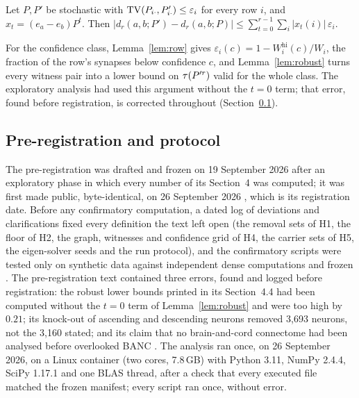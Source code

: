 \begin{lemma}\label{lem:robust}
Let $P,P'$ be stochastic with $\operatorname{TV}(P_{i\cdot},P'_{i\cdot})\le\varepsilon_i$ for every row $i$, and
$x_t=(e_a-e_b)P^t$. Then
$\bigl|d_r(a,b;P')-d_r(a,b;P)\bigr|\le\sum_{t=0}^{r-1}\sum_i |x_t(i)|\,\varepsilon_i$.
\end{lemma}

For the confidence class, Lemma~\ref{lem:row} gives
$\varepsilon_i(c)=1-W^{\mathrm{hi}}_i(c)/W_i$, the fraction of the row's synapses below confidence
$c$, and Lemma~\ref{lem:robust} turns every witness pair into a lower bound on $\tau(P'^r)$ valid for
the whole class. The exploratory analysis had used this argument without the $t=0$ term; that
error, found before registration, is corrected throughout (Section~\ref{sec:prereg}).

\subsection{Pre-registration and protocol}\label{sec:prereg}

The pre-registration was drafted and frozen on 19 September 2026 after an exploratory phase in which
every number of its Section~4 was computed; it was first made public, byte-identical, on
26 September 2026 \cite{kopel2026reg}, which is its registration date. Before any confirmatory
computation, a dated log of deviations and clarifications fixed every definition the text left open
(the removal sets of H1, the floor of H2, the graph, witnesses and confidence grid of H4, the
carrier sets of H5, the eigen-solver seeds and the run protocol), and the confirmatory scripts were
tested only on synthetic data against independent dense computations and frozen
\cite{kopel2026freeze}. The pre-registration text contained three errors, found and logged before
registration: the robust lower bounds printed in its Section~4.4 had been computed without the
$t=0$ term of Lemma~\ref{lem:robust} and were too high by $0.21$; its knock-out of ascending and
descending neurons removed 3{,}693 neurons, not the 3{,}160 stated; and its claim that no
brain-and-cord connectome had been analysed before overlooked BANC \cite{bates2026}. The analysis
ran once, on 26 September 2026, on a Linux container (two cores, 7.8\,GB) with Python 3.11,
NumPy 2.4.4, SciPy 1.17.1 and one BLAS thread, after a check that every executed file matched the
frozen manifest; every script ran once, without error.
